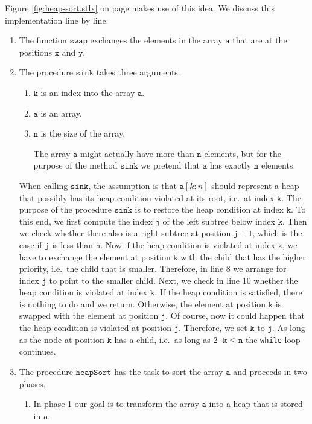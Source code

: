 Figure \ref{fig:heap-sort.stlx} on page \pageref{fig:basic-heapsort.stlx} makes use of this idea.
We discuss this implementation line by line.
\begin{enumerate}
\item The function $\mathtt{swap}$ exchanges the elements in the array $\mathtt{a}$ that are at the
      positions $\mathtt{x}$ and $\mathtt{y}$.
\item The procedure $\mathtt{sink}$ takes three arguments.
      \begin{enumerate}
      \item $\mathtt{k}$ is an index into the array $\mathtt{a}$.
      \item $\mathtt{a}$ is an array.
      \item $\mathtt{n}$ is the size of the array.  

            The array $\mathtt{a}$ might actually have more than $\mathtt{n}$ elements, but for the
            purpose of the method $\mathtt{sink}$ we pretend that $\mathtt{a}$ has exactly $\mathtt{n}$
            elements. 
      \end{enumerate}
      When calling $\mathtt{sink}$, the assumption is that $\mathtt{a}[k:n]$ should represent a heap 
      that possibly has its heap condition violated at its root, i.e.~at index $\mathtt{k}$.  The
      purpose of the procedure $\mathtt{sink}$ is to restore the heap condition at index $\mathtt{k}$.
      To this end, we first compute the index $\mathtt{j}$ of the left subtree below index $\mathtt{k}$.
      Then we check whether there also is a right subtree at position $\mathtt{j}+1$, which is the
      case if $\mathtt{j}$ is less than $\mathtt{n}$.  Now if the heap condition is violated at index
      $\mathtt{k}$, we have to exchange the element at  position $\mathtt{k}$ with the child that has
      the higher priority, i.e.~the child that is smaller. Therefore, in line 8 we arrange for index
      $\mathtt{j}$ to point to the smaller child.  Next, we check in line 10 whether the heap
      condition is violated at index $\mathtt{k}$.  If the heap condition is satisfied, there is
      nothing to do and we return.  Otherwise, the element at position $\mathtt{k}$ is swapped with
      the element at position $\mathtt{j}$.  Of course, now it could happen that the heap condition is
      violated at position $\mathtt{j}$.  Therefore, we set $\mathtt{k}$ to $\mathtt{j}$.
      As long as the node at position $\mathtt{k}$ has a child, i.e.~as long as 
      $2 \cdot \mathtt{k}\leq \mathtt{n}$ the \texttt{while}-loop continues.
\item The procedure $\mathtt{heapSort}$ has the task to sort the array $\mathtt{a}$ and proceeds in two phases.
      \begin{enumerate}
      \item In phase 1 our goal is to transform the array $\mathtt{a}$ into a heap that is stored in $\mathtt{a}$.


\end{enumerate}
\end{enumerate}
